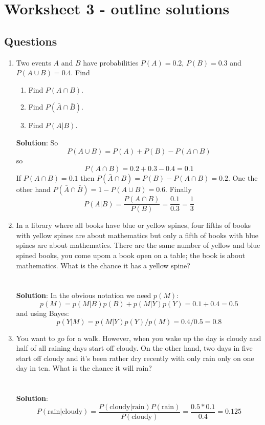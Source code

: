 \documentclass[11pt,a4paper]{scrartcl}
\begin{document}
\section*{Worksheet 3 - outline solutions}

\subsection*{Questions}

\begin{enumerate}

\item Two events $A$ and $B$ have probabilities $P(A)=0.2$, $P(B)=0.3$ and $P(A\cup B)=0.4$. Find
\begin{enumerate}
\item Find $P(A\cap B)$.
\item Find $P(\bar{A}\cap \bar{B})$.
\item Find $P(A|B)$.
\end{enumerate}
\textbf{Solution}: So
\begin{equation}
P(A\cup B)=P(A)+P(B)-P(A\cap B)
\end{equation}
so 
\begin{equation}
P(A\cap B)=0.2+0.3-0.4=0.1
\end{equation}
If $P(A\cap B)=0.1$ then $P(\bar{A}\cap B)=P(B)-P(A\cap B)=0.2$. One the other hand
$P(\bar{A}\cap \bar{B})=1-P(A\cup B)=0.6$. Finally
\begin{equation}
P(A|B)=\frac{P(A\cap B)}{P(B)}=\frac{0.1}{0.3}=\frac{1}{3}
\end{equation}


\item In a library where all books have blue or yellow spines, four
  fifths of books with yellow spines are about mathematics but only a
  fifth of books with blue spines are about mathematics. There are the
  same number of yellow and blue spined books, you come upom a book
  open on a table; the book is about mathematics. What is the chance
  it has a yellow spine?\\ \\ \\
  \textbf{Solution}: In the obvious notation we need $p(M)$:
  $$p(M)=p(M|B)p(B)+p(M|Y)p(Y)=0.1+0.4=0.5$$
  and using Bayes:
  $$p(Y|M)=p(M|Y)p(Y)/p(M)=0.4/0.5=0.8$$  


\item You want to go for a walk. However, when you wake up the day is
  cloudy and half of all raining days start off cloudy. On the other
  hand, two days in five start off cloudy and it's been rather dry
  recently with only rain only on one day in ten. What is the chance
  it will rain?\\ \\ \\
  \textbf{Solution}:
  \begin{equation}
      P(\mbox{rain}|\mbox{cloudy})=\frac{P(\mbox{cloudy}|\mbox{rain})P(\mbox{rain})}{P(\mbox{cloudy})}=\frac{0.5*0.1}{0.4}=0.125
    \end{equation}



\end{enumerate}
\end{document}
